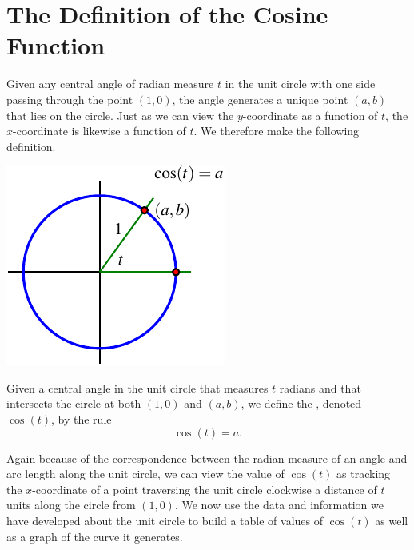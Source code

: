 \documentclass[nooutcomes]{ximera}
\begin{document}
\begin{center}  
\end{center} 


\section{The Definition of the Cosine Function}

Given any central angle of radian measure \(t\) in the unit circle with one side passing through the point \((1,0)\), the angle generates a unique point \((a,b)\) that lies on the circle.  Just as we can view the \(y\)-coordinate as a function of \(t\), the \(x\)-coordinate is likewise a function of \(t\).  We therefore make the following definition.

\begin{definition}
\begin{image}
\includegraphics{sine-defn-cosine.pdf}
\end{image}
Given a central angle in the unit circle that measures \(t\) radians and that intersects the circle at both \((1,0)\) and \((a,b)\), we define the , denoted \(\cos(t)\), by the rule
\begin{equation*}
\cos(t) = a\text{.}
\end{equation*}
\end{definition}

Again because of the correspondence between the radian measure of an angle and arc length along the unit circle, we can view the value of \(\cos(t)\) as tracking the \(x\)-coordinate of a point traversing the unit circle clockwise a distance of \(t\) units along the circle from \((1,0)\).  We now use the data and information we have developed about the unit circle to build a table of values of \(\cos(t)\) as well as a graph of the curve it generates.
\end{document}
